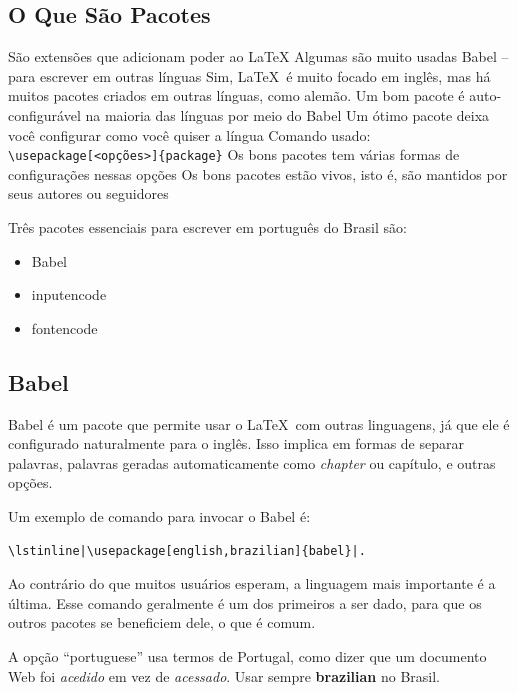 \subsection{O Que São Pacotes}
    \begin{outline}
        \1 São extensões que adicionam poder ao \LaTeX
        \1 Algumas são muito usadas
        \2 Babel -- para escrever em outras línguas
        \3 Sim, \LaTeX\ é muito focado em inglês, mas há muitos pacotes criados em outras línguas, como alemão.
        \3 Um bom pacote é auto-configurável na maioria das línguas por meio do Babel
        \3 Um ótimo pacote deixa você configurar como você quiser a língua
        \1 Comando usado:
        \2 \lstinline|\usepackage[<opções>]{package}|
        \1 Os bons pacotes tem várias formas de configurações nessas opções
        \1 Os bons pacotes estão vivos, isto é, são mantidos por seus autores ou seguidores
    \end{outline}

Três pacotes essenciais para escrever em português do Brasil são:
\begin{itemize}
    \item Babel
    \item inputencode
    \item fontencode
\end{itemize}


\subsection{Babel}

Babel\parencite{Braams:2020a} é um pacote que permite usar o \LaTeX\ com outras linguagens, já que ele é configurado naturalmente para o inglês. Isso implica em formas de separar palavras, palavras geradas automaticamente como \textit{chapter} ou capítulo, e outras opções. 


Um exemplo de comando para invocar o Babel é:
\begin{verbatim}
\lstinline|\usepackage[english,brazilian]{babel}|. 
\end{verbatim} 
Ao contrário do que muitos usuários esperam, a linguagem mais importante é a última. Esse comando geralmente é um dos primeiros a ser dado, para que os outros pacotes se beneficiem dele, o que é comum.
   
A opção ``portuguese'' usa termos de Portugal, como dizer que um documento Web foi \textit{acedido} em vez de \textit{acessado}. Usar sempre \textbf{brazilian} no Brasil. 


